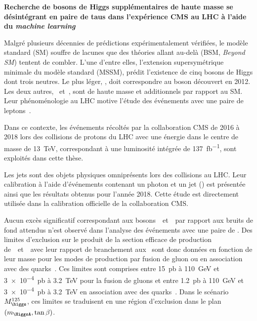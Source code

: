 \begin{center}
\LARGE
\bf
\sffamily
Recherche de bosons de Higgs supplémentaires de haute masse se désintégrant en paire de taus dans l'expérience CMS au LHC à l'aide du \emph{machine learning}
\end{center}

\vspace{2\baselineskip}

Malgré plusieurs décennies de prédictions expérimentalement vérifiées,
le modèle standard (SM) souffre de lacunes
que des théories allant au-delà (BSM, \emph{Beyond SM})
tentent de combler.
L'une d'entre elles,
l'extension supersymétrique minimale du modèle standard (MSSM),
prédit l'existence de cinq bosons de Higgs dont trois neutres.
Le plus léger, \higgs, doit correspondre au boson découvert en 2012.
Les deux autres, \Higgs\ et~\HiggsA, sont de haute masse et additionnels par rapport au SM.
Leur phénoménologie au LHC
motive l'étude des événements avec une paire de leptons~\tau.
\par
Dans ce contexte,
les événements récoltés par la collaboration CMS
de 2016 à 2018
lors des collisions de protons du LHC
avec une énergie dans le centre de masse de \SI{13}{\TeV},
correspondant à une luminosité intégrée de \SI{137}{\femto\barn^{-1}},
sont exploités dans cette thèse.
\par
Les jets sont des objets physiques omniprésents lors des collisions au LHC.
Leur calibration à l'aide d'événements contenant un photon et un jet (\Gjet) est présentée ainsi que les résultats obtenus pour l'année 2018.
Cette étude %
est directement utilisée dans la calibration officielle de la collaboration CMS.
\par
Aucun excès significatif correspondant aux bosons~\Higgs\ et~\HiggsA\ par rapport aux bruits de fond attendus n'est observé
dans l'analyse des événements avec une paire de \tau.
Des limites d'exclusion sur le produit de la section efficace de production de~\Higgs\ et~\HiggsA\ avec leur rapport de branchement aux \tau\ sont donc données
en fonction de leur masse
pour les modes de production par fusion de gluon ou en association avec des quarks~\quarkb.
Ces limites sont comprises entre
\SI{15}{\pico\barn} à \SI{110}{\GeV}
et
\SI{3e-4}{\pico\barn} à \SI{3.2}{\TeV}
pour la fusion de gluons
et entre
\SI{1.2}{\pico\barn} à \SI{110}{\GeV}
et
\SI{3e-4}{\pico\barn} à \SI{3.2}{\TeV}
en association avec des quarks~\quarkb.
Dans le scénario $M_{\higgs}^{125}$,
ces limites se traduisent en une région d'exclusion dans le plan $(m_{\HiggsA},\tan\beta)$.
